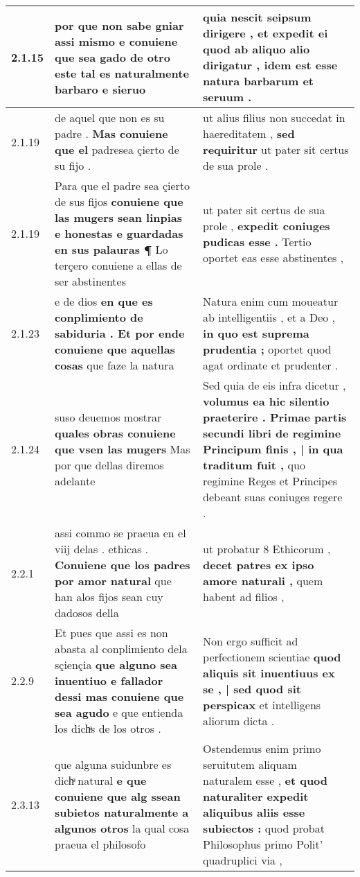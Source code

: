 \begin{tabular}{|p{1cm}|p{6.5cm}|p{6.5cm}|}
2.1.15 & por que non sabe gniar assi mismo \textbf{ e conuiene que sea gado de otro este } tal es naturalmente barbaro e sieruo & quia nescit seipsum dirigere , \textbf{ et expedit ei quod ab aliquo alio dirigatur , } idem est esse natura barbarum et seruum . \\\hline
2.1.19 & de aquel que non es su padre . \textbf{ Mas conuiene que el } padresea çierto de su fijo . & ut alius filius non succedat in haereditatem , \textbf{ sed requiritur } ut pater sit certus de sua prole . \\\hline
2.1.19 & Para que el padre sea çierto de sus fijos \textbf{ conuiene que las mugers sean linpias e honestas e guardadas en sus palauras ¶ } Lo terçero conuiene a ellas de ser abstinentes & ut pater sit certus de sua prole , \textbf{ expedit coniuges pudicas esse . } Tertio oportet eas esse abstinentes , \\\hline
2.1.23 & e de dios \textbf{ en que es conplimiento de sabiduria . Et por ende conuiene que aquellas cosas } que faze la natura & Natura enim cum moueatur ab intelligentiis , et a Deo , \textbf{ in quo est suprema prudentia ; } oportet quod agat ordinate et prudenter . \\\hline
2.1.24 & suso deuemos mostrar \textbf{ quales obras conuiene que vsen las mugers } Mas por que dellas diremos adelante & Sed quia de eis infra dicetur , \textbf{ volumus ea hic silentio praeterire . Primae partis secundi libri de regimine Principum finis , | in qua traditum fuit , } quo regimine Reges et Principes debeant suas coniuges regere . \\\hline
2.2.1 & assi commo se praeua en el viij delas . ethicas . \textbf{ Conuiene que los padres por amor natural } que han alos fijos sean cuy dadosos della & ut probatur 8 Ethicorum , \textbf{ decet patres ex ipso amore naturali , } quem habent ad filios , \\\hline
2.2.9 & Et pues que assi es non abasta al conplimiento dela sçiençia \textbf{ que alguno sea inuentiuo e fallador dessi mas conuiene que sea agudo } e que entienda los dichͣs de los otros . & Non ergo sufficit ad perfectionem scientiae \textbf{ quod aliquis sit inuentiuus ex se , | sed quod sit perspicax } et intelligens aliorum dicta . \\\hline
2.3.13 & que alguna suidunbre es dichͣ natural \textbf{ e que conuiene que alg ssean subietos naturalmente a algunos otros } la qual cosa praeua el philosofo & Ostendemus enim primo seruitutem aliquam naturalem esse , \textbf{ et quod naturaliter expedit aliquibus aliis esse subiectos : } quod probat Philosophus primo Polit’ quadruplici via , \\\hline

\end{tabular}
